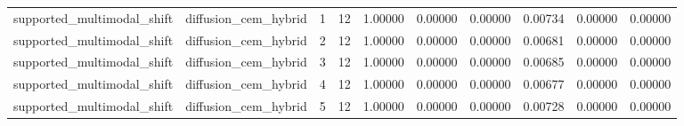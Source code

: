 \documentclass{article}
\begin{document}
\begin{table}[tbp]
{\begin{tabular}{llllllllll}
supported\_multimodal\_shift & diffusion\_cem\_hybrid & 1 & 12 & 1.00000 & 0.00000 & 0.00000 & 0.00734 & 0.00000 & 0.00000 \\
supported\_multimodal\_shift & diffusion\_cem\_hybrid & 2 & 12 & 1.00000 & 0.00000 & 0.00000 & 0.00681 & 0.00000 & 0.00000 \\
supported\_multimodal\_shift & diffusion\_cem\_hybrid & 3 & 12 & 1.00000 & 0.00000 & 0.00000 & 0.00685 & 0.00000 & 0.00000 \\
supported\_multimodal\_shift & diffusion\_cem\_hybrid & 4 & 12 & 1.00000 & 0.00000 & 0.00000 & 0.00677 & 0.00000 & 0.00000 \\
supported\_multimodal\_shift & diffusion\_cem\_hybrid & 5 & 12 & 1.00000 & 0.00000 & 0.00000 & 0.00728 & 0.00000 & 0.00000 \\
\bottomrule
\end{tabular}
}
\end{table}

\clearpage
\end{document}
